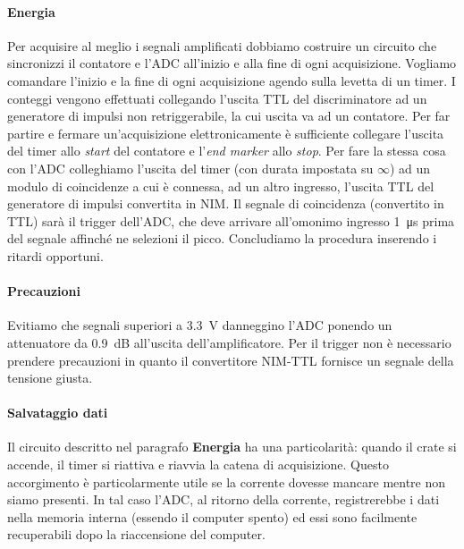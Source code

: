 \paragraph{Energia}
Per acquisire al meglio i segnali amplificati dobbiamo costruire un circuito che sincronizzi il contatore e l'ADC all'inizio e alla fine di ogni acquisizione.
Vogliamo comandare l'inizio e la fine di ogni acquisizione agendo sulla levetta di un timer.
I conteggi vengono effettuati collegando l'uscita TTL del discriminatore ad un generatore di impulsi non retriggerabile, la cui uscita va ad un contatore. Per far partire e fermare un'acquisizione elettronicamente è sufficiente collegare l'uscita del timer allo \emph{start} del contatore e l'\emph{end marker} allo \emph{stop}.
Per fare la stessa cosa con l'ADC colleghiamo l'uscita del timer (con durata impostata su $\infty$) ad un modulo di coincidenze a cui è connessa, ad un altro ingresso, l'uscita TTL del generatore di impulsi convertita in NIM. Il segnale di coincidenza (convertito in TTL) sarà il trigger dell'ADC, che deve arrivare all'omonimo ingresso \SI{1}{\micro s} prima del segnale affinché ne selezioni il picco.
Concludiamo la procedura inserendo i ritardi opportuni.

\paragraph{Precauzioni}
Evitiamo che segnali superiori a \SI{3.3}{V} danneggino l'ADC ponendo un attenuatore da \SI{0.9}{dB} all'uscita dell'amplificatore. Per il trigger non è necessario prendere precauzioni in quanto il convertitore NIM-TTL fornisce un segnale della tensione giusta. 

\paragraph{Salvataggio dati}
Il circuito descritto nel paragrafo \textbf{Energia} ha una particolarità: quando il crate si accende, il timer si riattiva e riavvia la catena di acquisizione.
Questo accorgimento è particolarmente utile se la corrente dovesse mancare mentre non siamo presenti. In tal caso l'ADC, al ritorno della corrente, registrerebbe i dati nella memoria interna (essendo il computer spento) ed essi sono facilmente recuperabili dopo la riaccensione del computer.


